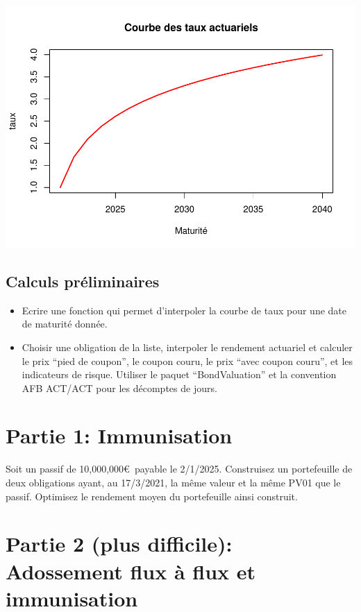 \documentclass[
]{article}
\providecommand{\tightlist}{%
  \setlength{\itemsep}{0pt}\setlength{\parskip}{0pt}}
\begin{document}
\includegraphics{TP-8_files/figure-latex/unnamed-chunk-2-1.pdf}

\hypertarget{calculs-pruxe9liminaires}{%
\subsection{Calculs préliminaires}\label{calculs-pruxe9liminaires}}

\begin{itemize}
\tightlist
\item
  Ecrire une fonction qui permet d'interpoler la courbe de taux pour une
  date de maturité donnée.
\item
  Choisir une obligation de la liste, interpoler le rendement actuariel
  et calculer le prix ``pied de coupon'', le coupon couru, le prix
  ``avec coupon couru'', et les indicateurs de risque. Utiliser le
  paquet ``BondValuation'' et la convention AFB ACT/ACT pour les
  décomptes de jours.
\end{itemize}

\hypertarget{partie-1-immunisation}{%
\section{Partie 1: Immunisation}\label{partie-1-immunisation}}

Soit un passif de 10,000,000\euro~payable le 2/1/2025. Construisez un
portefeuille de deux obligations ayant, au 17/3/2021, la même valeur et
la même PV01 que le passif. Optimisez le rendement moyen du portefeuille
ainsi construit.

\hypertarget{partie-2-plus-difficile-adossement-flux-uxe0-flux-et-immunisation}{%
\section{Partie 2 (plus difficile): Adossement flux à flux et
immunisation}\label{partie-2-plus-difficile-adossement-flux-uxe0-flux-et-immunisation}}
\end{document}
